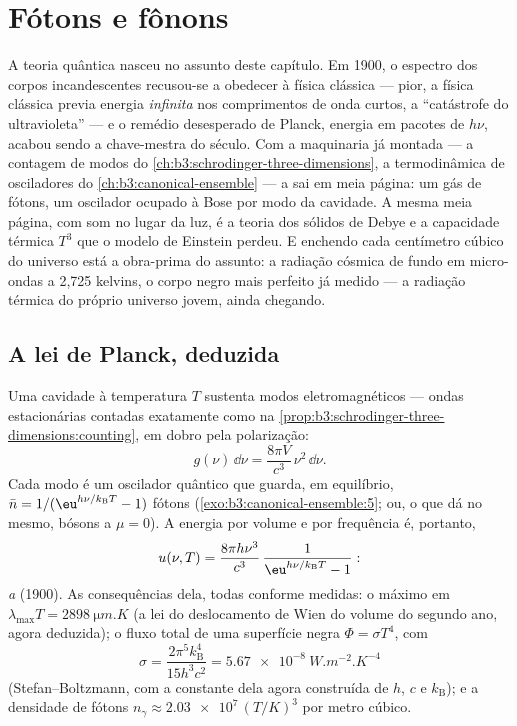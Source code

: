 \chapter{Fótons e fônons}\label{ch:b3:photons-phonons}

A teoria quântica nasceu no assunto deste capítulo. Em 1900, o
espectro dos corpos incandescentes recusou-se a obedecer à física
clássica --- pior, a física clássica previa energia \emph{infinita} nos
comprimentos de onda curtos, a ``catástrofe do ultravioleta'' --- e o
remédio desesperado de Planck, energia em pacotes de $h\nu$, acabou
sendo a chave-mestra do século. Com a maquinaria já montada --- a
contagem de modos do \cref{ch:b3:schrodinger-three-dimensions}, a
termodinâmica de osciladores do \cref{ch:b3:canonical-ensemble} --- a 
sai em meia página: um gás de fótons, um oscilador ocupado à Bose
por modo da cavidade. A mesma meia página, com som no lugar da luz,
é a teoria dos sólidos de Debye e a capacidade térmica $T^3$ que o
modelo de Einstein perdeu. E enchendo cada centímetro cúbico do
universo está a obra-prima do assunto: a radiação cósmica de fundo em
micro-ondas a 2,725 kelvins, o corpo negro mais perfeito já medido --- a
radiação térmica do próprio universo jovem, ainda chegando.

\section{A lei de Planck, deduzida}

\begin{theorem}\label{thm:b3:photons-phonons:planck}
Uma cavidade à temperatura $T$ sustenta modos eletromagnéticos ---
ondas estacionárias contadas exatamente como na
\cref{prop:b3:schrodinger-three-dimensions:counting}, em dobro pela
polarização:
\[
g(\nu)\,\dd\nu = \frac{8\pi V}{c^3}\,\nu^2\,\dd\nu .
\]
Cada modo é um oscilador quântico que guarda, em equilíbrio,
$\bar n = 1/(\eu^{h\nu/k_{\text{B}}T} - 1)$ fótons
(\cref{exo:b3:canonical-ensemble:5}; ou, o que dá no mesmo, bósons a $\mu =
0$). A energia por volume e por frequência é, portanto,
\[
u(\nu, T) = \frac{8\pi h\nu^3}{c^3}\,
\frac{1}{\eu^{h\nu/k_{\text{B}}T} - 1} :
\]
\emph{a } (1900). As consequências dela, todas conforme
medidas: o máximo em $\lambda_{\max}T = \qty{2898}{\micro m.K}$ (a lei
do deslocamento de Wien do volume do segundo ano, agora deduzida); o
fluxo total de uma superfície negra $\Phi = \sigma T^4$, com
\[
\sigma = \frac{2\pi^5k_{\text{B}}^4}{15h^3c^2}
 = \qty{5.67e-8}{W.m^{-2}.K^{-4}}
\]
(Stefan--Boltzmann, com a constante dela agora construída de $h$, $c$ e
$k_{\text{B}}$); e a densidade de fótons $n_\gamma \approx
\num{2.03e7}\,(T/\unit{K})^3$ por metro cúbico.
\end{theorem}

